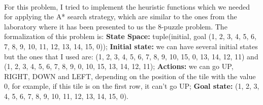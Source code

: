 \documentclass[14pt]{article}
\begin{document}
\vspace{2.5 mm}
\\For this problem, I tried to implement the heuristic functions which we needed for applying the A* search strategy, which are similar to the ones from the laboratory where it has been presented to us the 8-puzzle problem. The formalization of this problem is: \textbf{State Space: }tuple(initial, goal \eq (1, 2, 3, 4, 5, 6, 7, 8, 9, 10, 11, 12, 13, 14, 15, 0)); \textbf{Initial state: }we can have several initial states but the ones that I used are: (1, 2, 3, 4, 5, 6, 7, 8, 9, 10, 15, 0, 13, 14, 12, 11) and (1, 2, 3, 4, 5, 6, 7, 8, 9, 0, 10, 15, 13, 14, 12, 11); \textbf{Actions: }we can go UP, RIGHT, DOWN and LEFT, depending on the position of the tile with the value 0, for example, if this tile is on the first row, it can't go UP; \textbf{Goal state: }(1, 2, 3, 4, 5, 6, 7, 8, 9, 10, 11, 12, 13, 14, 15, 0).
\end{document}
